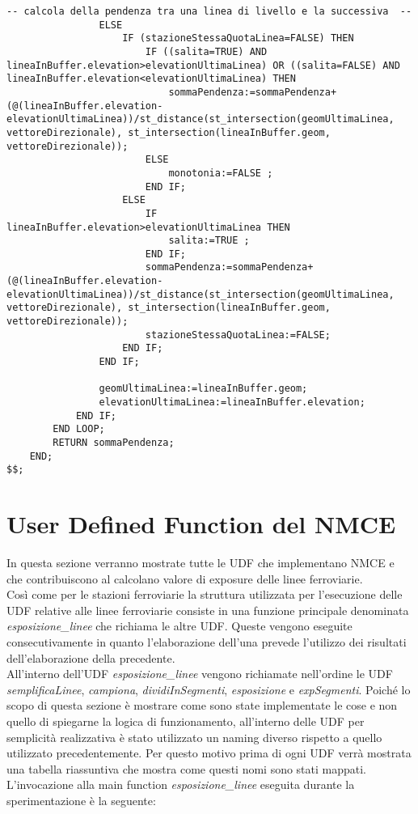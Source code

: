 \begin{lstlisting}[style=mySQL]
				-- calcola della pendenza tra una linea di livello e la successiva  --
				ELSE
					IF (stazioneStessaQuotaLinea=FALSE) THEN
						IF ((salita=TRUE) AND lineaInBuffer.elevation>elevationUltimaLinea) OR ((salita=FALSE) AND lineaInBuffer.elevation<elevationUltimaLinea) THEN
							sommaPendenza:=sommaPendenza+(@(lineaInBuffer.elevation-elevationUltimaLinea))/st_distance(st_intersection(geomUltimaLinea, vettoreDirezionale), st_intersection(lineaInBuffer.geom, vettoreDirezionale));
						ELSE
							monotonia:=FALSE ;
						END IF;
					ELSE
						IF lineaInBuffer.elevation>elevationUltimaLinea THEN
							salita:=TRUE ;
						END IF;
						sommaPendenza:=sommaPendenza+(@(lineaInBuffer.elevation-elevationUltimaLinea))/st_distance(st_intersection(geomUltimaLinea, vettoreDirezionale), st_intersection(lineaInBuffer.geom, vettoreDirezionale));
						stazioneStessaQuotaLinea:=FALSE;
					END IF;
				END IF;

				geomUltimaLinea:=lineaInBuffer.geom;
				elevationUltimaLinea:=lineaInBuffer.elevation;
			END IF;
		END LOOP;
		RETURN sommaPendenza;
	END;
$$;
\end{lstlisting}


\section{User Defined Function del NMCE}
\label{udfnmce}
In questa sezione verranno mostrate tutte le UDF che implementano NMCE e che contribuiscono al calcolano valore di exposure delle linee ferroviarie.\\ 
Così come per le stazioni ferroviarie la struttura utilizzata per l'esecuzione delle UDF relative alle linee ferroviarie consiste in una funzione principale denominata \textit{esposizione\_linee} che richiama le altre UDF.
Queste vengono eseguite consecutivamente in quanto l'elaborazione dell'una prevede l'utilizzo dei risultati dell'elaborazione della precedente. \\
All'interno dell'UDF \textit{esposizione\_linee} vengono richiamate nell'ordine le UDF \textit{semplificaLinee}, \textit{campiona}, \textit{dividiInSegmenti}, \textit{esposizione} e \textit{expSegmenti}.
Poiché lo scopo di questa sezione è mostrare come sono state implementate le cose e non quello di spiegarne la logica di funzionamento, all'interno delle UDF per semplicità realizzativa è stato utilizzato un naming diverso rispetto a quello utilizzato precedentemente. Per questo motivo prima di ogni UDF verrà mostrata una tabella riassuntiva che mostra come questi nomi sono stati mappati. 
L'invocazione alla main function \textit{esposizione\_linee} eseguita durante la sperimentazione è la seguente:

